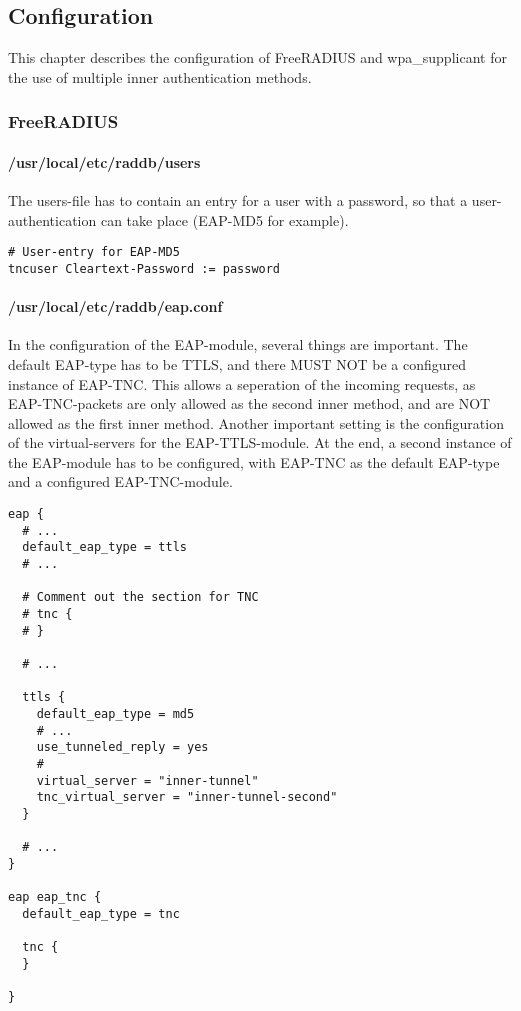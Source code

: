 \subsection{Configuration}
This chapter describes the configuration of FreeRADIUS and wpa\_supplicant for the use of multiple inner authentication methods.

\subsubsection*{FreeRADIUS}
\paragraph{/usr/local/etc/raddb/users}
The users-file has to contain an entry for a user with a password, so that a user-authentication can take place (EAP-MD5 for example).
\begin{lstlisting}[style=eapttls-config]
# User-entry for EAP-MD5
tncuser Cleartext-Password := password
\end{lstlisting}

\paragraph{/usr/local/etc/raddb/eap.conf}
In the configuration of the EAP-module, several things are important.
The default EAP-type has to be TTLS, and there MUST NOT be a configured instance of EAP-TNC.
This allows a seperation of the incoming requests, as EAP-TNC-packets are only allowed as the second inner method,
and are NOT allowed as the first inner method.
Another important setting is the configuration of the virtual-servers for the EAP-TTLS-module.
At the end, a second instance of the EAP-module has to be configured, with EAP-TNC as the default EAP-type and a configured EAP-TNC-module.
\begin{lstlisting}[style=eapttls-config]
eap {
  # ...
  default_eap_type = ttls
  # ...

  # Comment out the section for TNC
  # tnc {
  # }

  # ...

  ttls {
    default_eap_type = md5
    # ...
    use_tunneled_reply = yes
    #
    virtual_server = "inner-tunnel"
    tnc_virtual_server = "inner-tunnel-second"
  }

  # ...
}

eap eap_tnc {
  default_eap_type = tnc

  tnc {
  }

}
\end{lstlisting}

